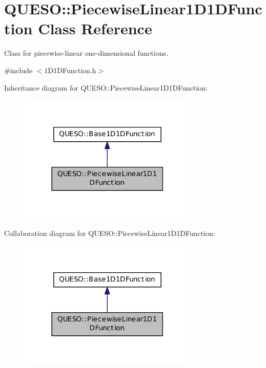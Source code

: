 \hypertarget{class_q_u_e_s_o_1_1_piecewise_linear1_d1_d_function}{\section{Q\-U\-E\-S\-O\-:\-:Piecewise\-Linear1\-D1\-D\-Function Class Reference}
\label{class_q_u_e_s_o_1_1_piecewise_linear1_d1_d_function}
}


Class for piecewise-\/linear one-\/dimensional functions.  




{\ttfamily \#include $<$1\-D1\-D\-Function.\-h$>$}



Inheritance diagram for Q\-U\-E\-S\-O\-:\-:Piecewise\-Linear1\-D1\-D\-Function\-:
\nopagebreak
\begin{figure}[H]
\begin{center}
\leavevmode
\includegraphics[width=242pt]{class_q_u_e_s_o_1_1_piecewise_linear1_d1_d_function__inherit__graph}
\end{center}
\end{figure}


Collaboration diagram for Q\-U\-E\-S\-O\-:\-:Piecewise\-Linear1\-D1\-D\-Function\-:
\nopagebreak
\begin{figure}[H]
\begin{center}
\leavevmode
\includegraphics[width=242pt]{class_q_u_e_s_o_1_1_piecewise_linear1_d1_d_function__coll__graph}
\end{center}
\end{figure}
